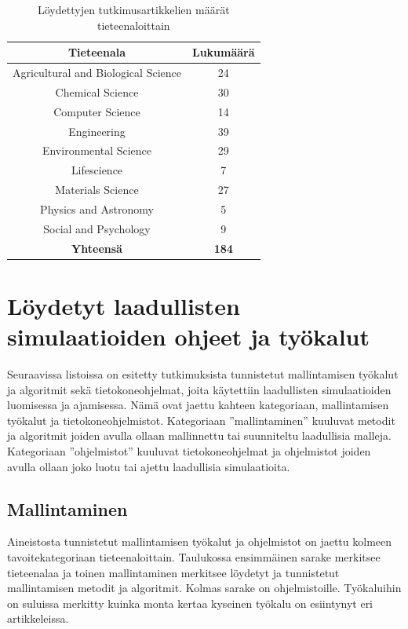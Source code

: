 \documentclass[utf8]{gradu3}
\begin{document}
\begin{table}[ht]
    \centering
    \begin{tabular}{|c|c|}
        \hline
        \textbf{Tieteenala} & \textbf{Lukumäärä} \\
        \hline
        Agricultural and Biological Science & 24 \\
        \hline
        Chemical Science & 30 \\
        \hline
        Computer Science & 14 \\
        \hline
        Engineering & 39 \\
        \hline
        Environmental Science & 29 \\
        \hline
        Lifescience & 7 \\
        \hline
        Materials Science & 27 \\
        \hline
        Physics and Astronomy & 5 \\
        \hline
        Social and Psychology & 9 \\
        \hline
        \textbf{Yhteensä} & \textbf{184} \\
        \hline
    \end{tabular}
    \caption{Löydettyjen tutkimusartikkelien määrät tieteenaloittain}
    \label{tab:tieteenalat lkm}
\end{table}

\section{Löydetyt laadullisten simulaatioiden ohjeet ja työkalut} \label{tyokalut}
Seuraavissa listoissa on esitetty tutkimuksista tunnistetut mallintamisen työkalut 
ja algoritmit sekä tietokoneohjelmat,
joita käytettiin laadullisten simulaatioiden luomisessa ja ajamisessa. 
Nämä ovat jaettu kahteen kategoriaan, mallintamisen työkalut 
ja tietokoneohjelmistot. 
Kategoriaan ''mallintaminen'' kuuluvat metodit ja algoritmit 
joiden avulla ollaan mallinnettu tai suunniteltu laadullisia malleja.
Kategoriaan ''ohjelmistot'' kuuluvat tietokoneohjelmat ja ohjelmistot 
joiden avulla ollaan joko luotu tai ajettu laadullisia simulaatioita.

\subsection{Mallintaminen}
Aineistosta tunnistetut mallintamisen työkalut ja ohjelmistot on jaettu kolmeen
tavoitekategoriaan tieteenaloittain. Taulukossa ensimmäinen sarake merkitsee
tieteenalaa  ja toinen mallintaminen merkitsee löydetyt ja tunnistetut 
mallintamisen metodit ja algoritmit. Kolmas sarake on ohjelmistoille. 
Työkaluihin on suluissa merkitty 
kuinka monta kertaa kyseinen työkalu on esiintynyt eri artikkeleissa.
\end{document}
